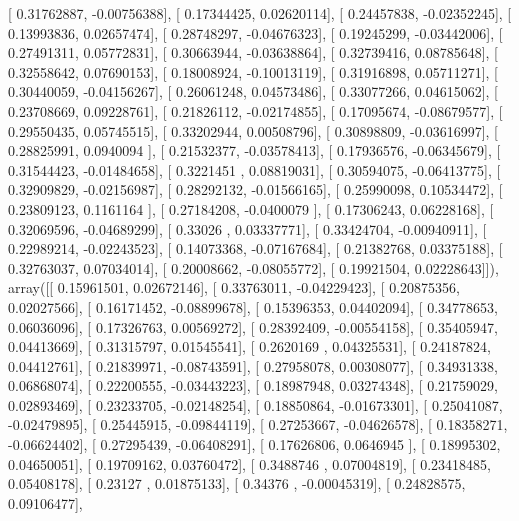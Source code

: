 \documentclass{article}
\begin{document}
       [ 0.31762887, -0.00756388],
       [ 0.17344425,  0.02620114],
       [ 0.24457838, -0.02352245],
       [ 0.13993836,  0.02657474],
       [ 0.28748297, -0.04676323],
       [ 0.19245299, -0.03442006],
       [ 0.27491311,  0.05772831],
       [ 0.30663944, -0.03638864],
       [ 0.32739416,  0.08785648],
       [ 0.32558642,  0.07690153],
       [ 0.18008924, -0.10013119],
       [ 0.31916898,  0.05711271],
       [ 0.30440059, -0.04156267],
       [ 0.26061248,  0.04573486],
       [ 0.33077266,  0.04615062],
       [ 0.23708669,  0.09228761],
       [ 0.21826112, -0.02174855],
       [ 0.17095674, -0.08679577],
       [ 0.29550435,  0.05745515],
       [ 0.33202944,  0.00508796],
       [ 0.30898809, -0.03616997],
       [ 0.28825991,  0.0940094 ],
       [ 0.21532377, -0.03578413],
       [ 0.17936576, -0.06345679],
       [ 0.31544423, -0.01484658],
       [ 0.3221451 ,  0.08819031],
       [ 0.30594075, -0.06413775],
       [ 0.32909829, -0.02156987],
       [ 0.28292132, -0.01566165],
       [ 0.25990098,  0.10534472],
       [ 0.23809123,  0.1161164 ],
       [ 0.27184208, -0.0400079 ],
       [ 0.17306243,  0.06228168],
       [ 0.32069596, -0.04689299],
       [ 0.33026   ,  0.03337771],
       [ 0.33424704, -0.00940911],
       [ 0.22989214, -0.02243523],
       [ 0.14073368, -0.07167684],
       [ 0.21382768,  0.03375188],
       [ 0.32763037,  0.07034014],
       [ 0.20008662, -0.08055772],
       [ 0.19921504,  0.02228643]]), array([[ 0.15961501,  0.02672146],
       [ 0.33763011, -0.04229423],
       [ 0.20875356,  0.02027566],
       [ 0.16171452, -0.08899678],
       [ 0.15396353,  0.04402094],
       [ 0.34778653,  0.06036096],
       [ 0.17326763,  0.00569272],
       [ 0.28392409, -0.00554158],
       [ 0.35405947,  0.04413669],
       [ 0.31315797,  0.01545541],
       [ 0.2620169 ,  0.04325531],
       [ 0.24187824,  0.04412761],
       [ 0.21839971, -0.08743591],
       [ 0.27958078,  0.00308077],
       [ 0.34931338,  0.06868074],
       [ 0.22200555, -0.03443223],
       [ 0.18987948,  0.03274348],
       [ 0.21759029,  0.02893469],
       [ 0.23233705, -0.02148254],
       [ 0.18850864, -0.01673301],
       [ 0.25041087, -0.02479895],
       [ 0.25445915, -0.09844119],
       [ 0.27253667, -0.04626578],
       [ 0.18358271, -0.06624402],
       [ 0.27295439, -0.06408291],
       [ 0.17626806,  0.0646945 ],
       [ 0.18995302,  0.04650051],
       [ 0.19709162,  0.03760472],
       [ 0.3488746 ,  0.07004819],
       [ 0.23418485,  0.05408178],
       [ 0.23127   ,  0.01875133],
       [ 0.34376   , -0.00045319],
       [ 0.24828575,  0.09106477],
\end{document}

